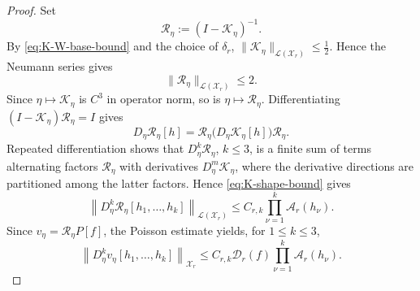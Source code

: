 \documentclass[10pt,a4paper]{amsart}
\begin{document}
\begin{proof}
Set
\[
 \mathcal R_\eta:=(I-\mathcal K_\eta)^{-1}.
\]
By \eqref{eq:K-W-base-bound} and the choice of \(\delta_r\),
\(\|\mathcal K_\eta\|_{\mathcal L(\mathcal X_r)} \leq\frac12\).
Hence the Neumann series gives
\[
 \|\mathcal R_\eta\|_{\mathcal L(\mathcal X_r)}\leq2.
\]
Since \(\eta\mapsto\mathcal K_\eta\) is \(C^3\) in operator norm, so
is \(\eta\mapsto\mathcal R_\eta\). Differentiating
\((I-\mathcal K_\eta)\mathcal R_\eta=I\) gives
\[
 D_\eta\mathcal R_\eta[h]
 = \mathcal R_\eta
 \bigl(D_\eta\mathcal K_\eta[h]\bigr) \mathcal R_\eta.
\]
Repeated differentiation shows that \(D_\eta^k\mathcal R_\eta\), \(k\leq3\), is a finite sum of terms alternating factors \(\mathcal R_\eta\) with derivatives
\(D_\eta^m\mathcal K_\eta\), where the derivative directions are partitioned among the latter factors. 
Hence \eqref{eq:K-shape-bound}
gives
\[
 \left\|D_\eta^k\mathcal R_\eta[h_1,\ldots,h_k]\right\|_{\mathcal L(\mathcal X_r)}
 \leq C_{r,k}\prod_{\nu=1}^k\mathcal A_r(h_\nu).
\]
Since \(v_\eta=\mathcal R_\eta P[f]\), the Poisson estimate yields, for \(1\leq k\leq3\),
\begin{equation*}
 \left\| D_\eta^kv_\eta [h_1,\ldots,h_k] \right\|_{\mathcal X_r} \leq C_{r,k} \mathcal D_r(f) \prod_{\nu=1}^k \mathcal A_r(h_\nu).
\end{equation*}


\end{proof}
\end{document}
